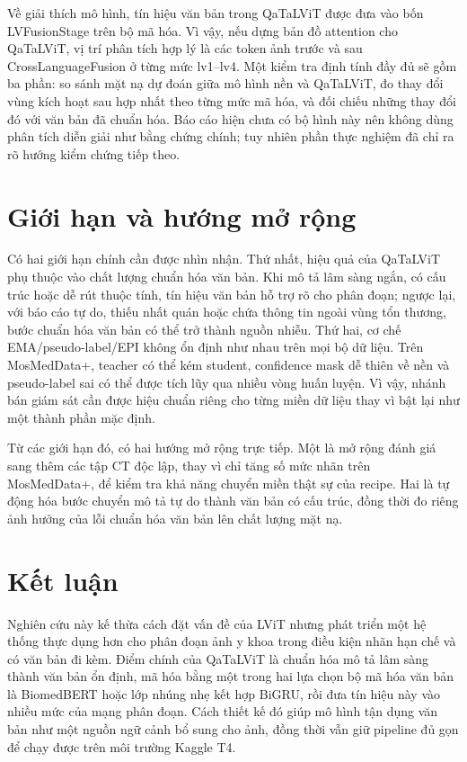 Về giải thích mô hình, tín hiệu văn bản trong QaTaLViT được đưa vào bốn LVFusionStage trên bộ mã hóa. Vì vậy, nếu dựng bản đồ attention cho QaTaLViT, vị trí phân tích hợp lý là các token ảnh trước và sau CrossLanguageFusion ở từng mức lv1--lv4. Một kiểm tra định tính đầy đủ sẽ gồm ba phần: so sánh mặt nạ dự đoán giữa mô hình nền và QaTaLViT, đo thay đổi vùng kích hoạt sau hợp nhất theo từng mức mã hóa, và đối chiếu những thay đổi đó với văn bản đã chuẩn hóa. Báo cáo hiện chưa có bộ hình này nên không dùng phân tích diễn giải như bằng chứng chính; tuy nhiên phần thực nghiệm đã chỉ ra rõ hướng kiểm chứng tiếp theo.

\section{Giới hạn và hướng mở rộng}
\label{sec:limitations}

Có hai giới hạn chính cần được nhìn nhận. Thứ nhất, hiệu quả của QaTaLViT phụ thuộc vào chất lượng chuẩn hóa văn bản. Khi mô tả lâm sàng ngắn, có cấu trúc hoặc dễ rút thuộc tính, tín hiệu văn bản hỗ trợ rõ cho phân đoạn; ngược lại, với báo cáo tự do, thiếu nhất quán hoặc chứa thông tin ngoài vùng tổn thương, bước chuẩn hóa văn bản có thể trở thành nguồn nhiễu. Thứ hai, cơ chế EMA/pseudo-label/EPI không ổn định như nhau trên mọi bộ dữ liệu. Trên MosMedData+, teacher có thể kém student, confidence mask dễ thiên về nền và pseudo-label sai có thể được tích lũy qua nhiều vòng huấn luyện. Vì vậy, nhánh bán giám sát cần được hiệu chuẩn riêng cho từng miền dữ liệu thay vì bật lại như một thành phần mặc định.

Từ các giới hạn đó, có hai hướng mở rộng trực tiếp. Một là mở rộng đánh giá sang thêm các tập CT độc lập, thay vì chỉ tăng số mức nhãn trên MosMedData+, để kiểm tra khả năng chuyển miền thật sự của recipe. Hai là tự động hóa bước chuyển mô tả tự do thành văn bản có cấu trúc, đồng thời đo riêng ảnh hưởng của lỗi chuẩn hóa văn bản lên chất lượng mặt nạ.

\section{Kết luận}

Nghiên cứu này kế thừa cách đặt vấn đề của LViT nhưng phát triển một hệ thống thực dụng hơn cho phân đoạn ảnh y khoa trong điều kiện nhãn hạn chế và có văn bản đi kèm. Điểm chính của QaTaLViT là chuẩn hóa mô tả lâm sàng thành văn bản ổn định, mã hóa bằng một trong hai lựa chọn bộ mã hóa văn bản là BiomedBERT hoặc lớp nhúng nhẹ kết hợp BiGRU, rồi đưa tín hiệu này vào nhiều mức của mạng phân đoạn. Cách thiết kế đó giúp mô hình tận dụng văn bản như một nguồn ngữ cảnh bổ sung cho ảnh, đồng thời vẫn giữ pipeline đủ gọn để chạy được trên môi trường Kaggle T4.


